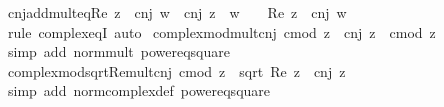 \begin{isabellebody}
\endisatagproof
{\isafoldproof}%
%
\isadelimproof
\isanewline
%
\endisadelimproof
\isanewline
{}\isamarkupfalse%
\ cnj{\isacharunderscore}{\kern0pt}add{\isacharunderscore}{\kern0pt}mult{\isacharunderscore}{\kern0pt}eq{\isacharunderscore}{\kern0pt}Re{\isacharcolon}{\kern0pt}\ {\isachardoublequoteopen}z\ {\isacharasterisk}{\kern0pt}\ cnj\ w\ {\isacharplus}{\kern0pt}\ cnj\ z\ {\isacharasterisk}{\kern0pt}\ w\ {\isacharequal}{\kern0pt}\ {}\ {\isacharasterisk}{\kern0pt}\ Re\ {\isacharparenleft}{\kern0pt}z\ {\isacharasterisk}{\kern0pt}\ cnj\ w{\isacharparenright}{\kern0pt}{\isachardoublequoteclose}\isanewline
%
\isadelimproof
\ \ %
\endisadelimproof
%
\isatagproof
{}\isamarkupfalse%
\ {\isacharparenleft}{\kern0pt}rule\ complex{\isacharunderscore}{\kern0pt}eqI{\isacharparenright}{\kern0pt}\ auto%
\endisatagproof
{\isafoldproof}%
%
\isadelimproof
\isanewline
%
\endisadelimproof
\isanewline
{}\isamarkupfalse%
\ complex{\isacharunderscore}{\kern0pt}mod{\isacharunderscore}{\kern0pt}mult{\isacharunderscore}{\kern0pt}cnj{\isacharcolon}{\kern0pt}\ {\isachardoublequoteopen}cmod\ {\isacharparenleft}{\kern0pt}z\ {\isacharasterisk}{\kern0pt}\ cnj\ z{\isacharparenright}{\kern0pt}\ {\isacharequal}{\kern0pt}\ {\isacharparenleft}{\kern0pt}cmod\ z{\isacharparenright}{\kern0pt}\isanewline
%
\isadelimproof
\ \ %
\endisadelimproof
%
\isatagproof
{}\isamarkupfalse%
\ {\isacharparenleft}{\kern0pt}simp\ add{\isacharcolon}{\kern0pt}\ norm{\isacharunderscore}{\kern0pt}mult\ power{}{\isacharunderscore}{\kern0pt}eq{\isacharunderscore}{\kern0pt}square{\isacharparenright}{\kern0pt}%
\endisatagproof
{\isafoldproof}%
%
\isadelimproof
\isanewline
%
\endisadelimproof
\isanewline
{}\isamarkupfalse%
\ complex{\isacharunderscore}{\kern0pt}mod{\isacharunderscore}{\kern0pt}sqrt{\isacharunderscore}{\kern0pt}Re{\isacharunderscore}{\kern0pt}mult{\isacharunderscore}{\kern0pt}cnj{\isacharcolon}{\kern0pt}\ {\isachardoublequoteopen}cmod\ z\ {\isacharequal}{\kern0pt}\ sqrt\ {\isacharparenleft}{\kern0pt}Re\ {\isacharparenleft}{\kern0pt}z\ {\isacharasterisk}{\kern0pt}\ cnj\ z{\isacharparenright}{\kern0pt}{\isacharparenright}{\kern0pt}{\isachardoublequoteclose}\isanewline
%
\isadelimproof
\ \ %
\endisadelimproof
%
\isatagproof
{}\isamarkupfalse%
\ {\isacharparenleft}{\kern0pt}simp\ add{\isacharcolon}{\kern0pt}\ norm{\isacharunderscore}{\kern0pt}complex{\isacharunderscore}{\kern0pt}def\ power{}{\isacharunderscore}{\kern0pt}eq{\isacharunderscore}{\kern0pt}square{\isacharparenright}{\kern0pt}%

\end{isabellebody}
